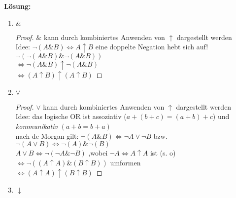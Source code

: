 \documentclass[paper=a4,fontsize=11pt]{scrartcl}%
\numberwithin{equation}{section}
\newenvironment{solution}
	{
		\color{Blue}
		\textbf{Lösung:}
	}{}
\begin{document}
\begin{enumerate}
	\begin{solution}
	
	\begin{enumerate}
\item $\&$
\begin{proof}
$\&$ kann durch kombiniertes Anwenden von $\uparrow$ dargestellt werden\\
Idee: $ \neg (A \& B) \Leftrightarrow A \uparrow B $ eine doppelte Negation hebt sich auf!\\
$ \neg (\neg (A \& B) \& \neg (A \& B))$\\
$ \Leftrightarrow \neg (A \& B) \uparrow \neg (A \& B)$\\
$ \Leftrightarrow (A \uparrow B) \uparrow (A \uparrow B)$
\end{proof}
\item $\lor$
\begin{proof}
$\lor$ kann durch kombiniertes Anwenden von $\uparrow$ dargestellt werden\\
Idee: das logische OR ist assoziativ ($a+(b+c)=(a+b)+c$) und \textit{kommunikativ} $(a + b = b +a)$ \\ 
nach de Morgan gilt: $\neg(A \& B) \Leftrightarrow \neg A \lor \neg B$ bzw. $\neg (A \lor B) \Leftrightarrow \neg (A) \& \neg(B) $\\
$A \lor B \Leftrightarrow \neg (\neg A \& \neg B)$ ,wobei $\neg A \Leftrightarrow A \uparrow A$ ist (s. o)\\
$ \Leftrightarrow \neg((A \uparrow A) \& (B \uparrow B))$ umformen\\
$ \Leftrightarrow (A \uparrow A) \uparrow (B \uparrow B)$ 
\end{proof}
\item $\downarrow$


\end{enumerate}
\end{solution}
\end{enumerate}
\end{document}
